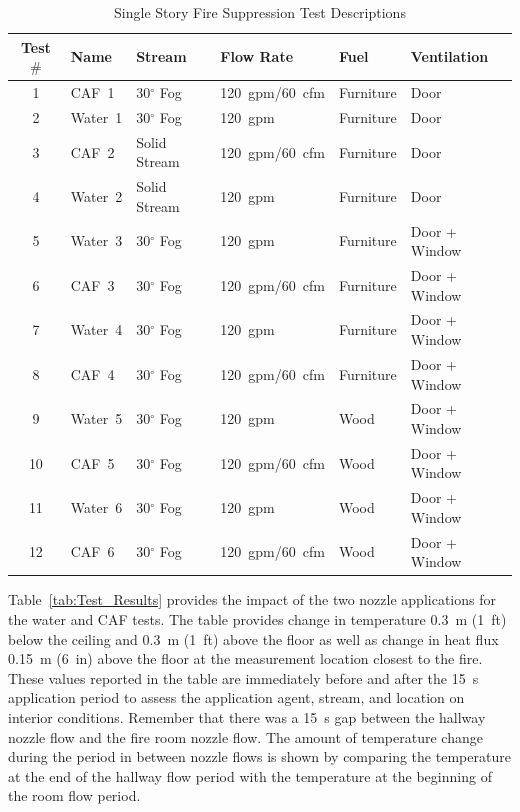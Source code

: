 \documentclass[12pt,oneside]{book}
\begin{document}
\begin{table}[!ht]
\centering
\caption{Single Story Fire Suppression Test Descriptions}\label{tab:Test_Descriptions}
\begin{tabular}{clllll}
\toprule[1.5pt]
Test $\#$  & Name	& Stream			& Flow Rate		& Fuel           & Ventilation     \\
\midrule
 1 & CAF~1    &  30$^{\circ}$ Fog   &  120~gpm/60~cfm   & Furniture      & Door            \\
 2 & Water~1  &  30$^{\circ}$ Fog  	&  120~gpm    		& Furniture      & Door            \\
 3 & CAF~2    &  Solid Stream       &  120~gpm/60~cfm   & Furniture      & Door            \\
 4 & Water~2  &  Solid Stream       &  120~gpm    		& Furniture      & Door            \\
 5 & Water~3  &  30$^{\circ}$ Fog  	&  120~gpm    		& Furniture      & Door + Window   \\
 6 & CAF~3    &  30$^{\circ}$ Fog   &  120~gpm/60~cfm   & Furniture      & Door + Window   \\
 7 & Water~4  &  30$^{\circ}$ Fog  	&  120~gpm    		& Furniture      & Door + Window   \\
 8 & CAF~4    &  30$^{\circ}$ Fog   &  120~gpm/60~cfm   & Furniture      & Door + Window   \\
 9 & Water~5  &  30$^{\circ}$ Fog  	&  120~gpm   		& Wood           & Door + Window   \\
10 & CAF~5    &  30$^{\circ}$ Fog   &  120~gpm/60~cfm   & Wood           & Door + Window   \\
11 & Water~6  &  30$^{\circ}$ Fog  	&  120~gpm    		& Wood           & Door + Window   \\
12 & CAF~6    &  30$^{\circ}$ Fog   &  120~gpm/60~cfm   & Wood           & Door + Window   \\
\bottomrule[1.25pt]
\end{tabular}\par
\end{table}

Table~\ref{tab:Test_Results} provides the impact of the two nozzle applications for the water and CAF tests. The table provides change in temperature 0.3~m (1~ft) below the ceiling and 0.3~m (1~ft) above the floor as well as change in heat flux 0.15~m (6~in) above the floor at the measurement location closest to the fire. These values reported in the table are immediately before and after the 15~s application period to assess the application agent, stream, and location on interior conditions. Remember that there was a 15~s gap between the hallway nozzle flow and the fire room nozzle flow. The amount of temperature change during the period in between nozzle flows is shown by comparing the temperature at the end of the hallway flow period with the temperature at the beginning of the room flow period.
\end{document}
